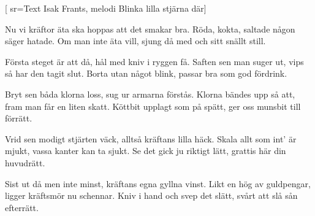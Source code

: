 [ 							
	sr={Text Isak Frants, melodi Blinka lilla stjärna där}]		
	
\beginverse*						
Nu vi kräftor äta ska
hoppas att det smakar bra.
Röda, kokta, saltade
någon säger hatade.
Om man inte äta vill,
sjung då med och sitt snällt still. 
\endverse						

\beginverse				
Första steget är att då,
hål med kniv i ryggen få.
Saften sen man suger ut,
vips så har den tagit slut.
Borta utan något blink,
passar bra som god fördrink.
\endverse				

\beginverse				
Bryt sen båda klorna loss,
sug ur armarna förstås.
Klorna bändes upp så att, 
fram man får en liten skatt.
Köttbit upplagt som på spätt,
ger oss munsbit till förrätt.
\endverse				

\beginverse				
Vrid sen modigt stjärten väck,
alltså kräftans lilla häck. 
Skala allt som int' är mjukt,
vassa kanter kan ta sjukt.
Se det gick ju riktigt lätt,
grattis här din huvudrätt.
\endverse				

\beginverse				
Sist ut då men inte minst,
kräftans egna gyllna vinst.
Likt en hög av guldpengar,
ligger kräftsmör nu schennar. 
Kniv i hand och svep det slätt,
svårt att slå sån efterrätt.
\endverse				
\endsong	
